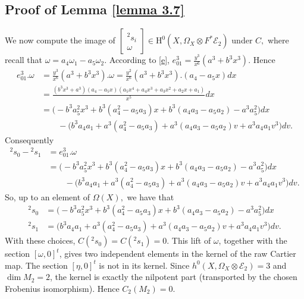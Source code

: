 \documentclass[12pt,a4]{amsart}
\theoremstyle{definition}
\begin{document}
\begin{appendix}
\subsection{Proof of Lemma \ref{lemma 3.7}}\label{proof_3}
We now compute the image of $\begin{bmatrix} {}^2s_i \\ \omega \end{bmatrix} \in \mathrm{H}^0(X,\Omega_X \otimes F^{*}\mathcal E_2) $ under $C,$ where recall that $\omega = a_4 \omega_1 - a_5 \omega_2.$
According to \eqref{e}, $e_{01}^3 = \frac{y^3}{x^6}(a^3+b^3x^3)$. Hence 
\begin{align*}
e_{01}^3.\omega & = \frac{y^3}{x^6}(a^3+b^3x^3) . \omega = \frac{y^2}{x^6}(a^3+b^3x^3) . (a_4-a_5x)dx \\
& = \frac{(b^3x^3+a^3)(a_4-a_5x)(a_5x^4+a_4x^3+a_3x^2+a_2x+a_1)}{x^5}dx \\
& = \big(-b^3a_5^2x^3+b^3(a_4^2-a_5a_3)x+b^3(a_4a_3-a_5a_2)-a^3a_5^2\big)dx\\
&\qquad - \big(b^3a_4a_1 +a^3(a_4^2-a_5a_3) + a^3(a_4a_3-a_5a_2)v +a^3a_4a_1v^3\big)dv.
\end{align*} 
Consequently 
\begin{align*}
{}^2s_0 - {}^2s_1 & = e_{01}^3.\omega \\
& = \big(-b^3a_5^2x^3+b^3(a_4^2-a_5a_3)x+b^3(a_4a_3-a_5a_2)-a^3a_5^2\big)dx\\
&\qquad  -\big(b^3a_4a_1 +a^3(a_4^2-a_5a_3) + a^3(a_4a_3-a_5a_2)v +a^3a_4a_1v^3\big)dv.
\end{align*}
So, up to an element of $\Omega(X),$ we have that
\begin{align}\label{eq_2-cocycle0}
{}^2s_0 & = \big(-b^3a_5^2x^3+b^3(a_4^2-a_5a_3)x+b^3(a_4a_3-a_5a_2)-a^3a_5^2\big)dx \\
\label{eq_2-cocycle1}
{}^2s_1 & = \big(b^3a_4a_1 +a^3(a_4^2-a_5a_3) +a^3(a_4a_3-a_5a_2)v +a^3a_4a_1v^3\big)dv.
\end{align}
With these choices, $C({}^2s_0)=C({}^2s_1)=0$.
This lift of $\omega$, together with the section $[\omega,0]^t$,
gives two independent elements in the kernel of the raw Cartier map.
The section $[\eta,0]^t$ is not in its kernel. Since
$h^0(X,\Omega_X\otimes\mathcal E_2)=3$ and $\dim M_2=2$,
the kernel is exactly the nilpotent part (transported by the chosen
Frobenius isomorphism). Hence $C_2(M_2)=0$. 
 
 

\end{appendix}
\end{document}
